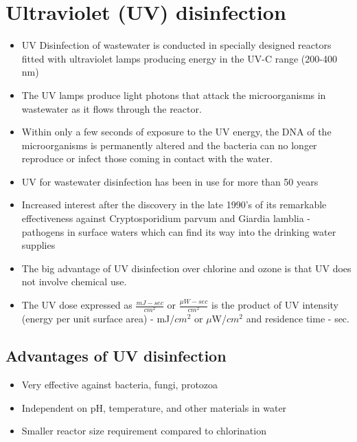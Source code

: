 \section{Ultraviolet (UV) disinfection}

\begin{itemize}
	\item UV Disinfection of wastewater is conducted in specially designed reactors fitted with ultraviolet lamps producing energy in the UV-C range (200-400 nm)
	\item The UV lamps produce light photons that attack the microorganisms in wastewater as it flows through the reactor. 
	\item Within only a few seconds of exposure to the UV energy, the DNA of the microorganisms is permanently altered and the bacteria can no longer reproduce or infect those coming in contact with the water. 
	\item UV for wastewater disinfection has been in use for more than 50 years
	\item Increased interest after the discovery in the late 1990's of its remarkable effectiveness against Cryptosporidium parvum and Giardia lamblia - pathogens in surface waters which can find its way into the drinking water supplies
	\item The big advantage of UV disinfection over chlorine and ozone is that UV does not involve chemical use.
	\item The UV dose expressed as $\frac{mJ-sec}{cm^2}$ or $\frac{\mu W-sec}{cm^2}$ is the product of UV intensity (energy per unit surface area) - mJ/$cm^2$ or $\mu$W/$cm^2$ and residence time - sec.  

\end{itemize}

\subsection{Advantages of UV disinfection}
	\begin{itemize}
		\item Very effective against bacteria, fungi, protozoa
		\item Independent on pH, temperature, and other materials in water
		\item Smaller reactor size requirement compared to chlorination
	\end{itemize}
